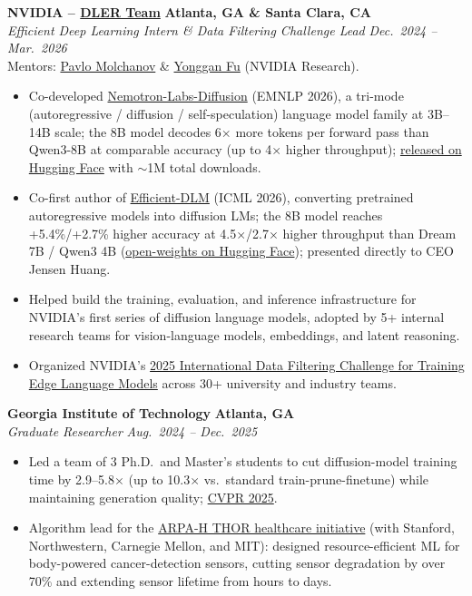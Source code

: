 \documentclass[10pt,a4paper]{article}
\newcommand{\cvlink}[2]{\href{#1}{#2}}
\newcommand{\entry}[4]{%
  \noindent\textbf{#1} \hfill \textbf{#2}\\
  \textit{#3} \hfill \textit{#4}%
}
\begin{document}
\smallskip
\entry{NVIDIA -- \cvlink{https://nv-dler.github.io/}{DLER Team}}{Atlanta, GA \& Santa Clara, CA}{Efficient Deep Learning Intern \& Data Filtering Challenge Lead}{Dec.\ 2024 -- Mar.\ 2026}\\
{\footnotesize Mentors: \cvlink{https://pmolchanov.com/}{Pavlo Molchanov} \& \cvlink{https://www.yongganfu.com/}{Yonggan Fu} (NVIDIA Research).}
\begin{itemize}[leftmargin=*, nosep, itemsep=2pt, topsep=2pt]
  \item Co-developed \cvlink{https://arxiv.org/pdf/2607.05722}{Nemotron-Labs-Diffusion} (EMNLP 2026), a tri-mode (autoregressive / diffusion / self-speculation) language model family at 3B--14B scale; the 8B model decodes 6$\times$ more tokens per forward pass than Qwen3-8B at comparable accuracy (up to 4$\times$ higher throughput); \cvlink{https://huggingface.co/collections/nvidia/nemotron-labs-diffusion}{released on Hugging Face} with $\sim$1M total downloads.
  \item Co-first author of \cvlink{https://arxiv.org/pdf/2512.14067}{Efficient-DLM} (ICML 2026), converting pretrained autoregressive models into diffusion LMs; the 8B model reaches +5.4\%/+2.7\% higher accuracy at 4.5$\times$/2.7$\times$ higher throughput than Dream 7B / Qwen3 4B (\cvlink{https://huggingface.co/collections/nvidia/efficient-dlm}{open-weights on Hugging Face}); presented directly to CEO Jensen Huang.
  \item Helped build the training, evaluation, and inference infrastructure for NVIDIA's first series of diffusion language models, adopted by 5+ internal research teams for vision-language models, embeddings, and latent reasoning.
  \item Organized NVIDIA's \href{https://sites.google.com/view/datafilteringchallenge/home}{2025 International Data Filtering Challenge for Training Edge Language Models} across 30+ university and industry teams.
\end{itemize}

\smallskip
\entry{Georgia Institute of Technology}{Atlanta, GA}{Graduate Researcher}{Aug.\ 2024 -- Dec.\ 2025}
\begin{itemize}[leftmargin=*, nosep, itemsep=2pt, topsep=2pt]
  \item Led a team of 3 Ph.D.\ and Master's students to cut diffusion-model training time by 2.9--5.8$\times$ (up to 10.3$\times$ vs.\ standard train-prune-finetune) while maintaining generation quality; \cvlink{https://openaccess.thecvf.com/content/CVPR2025/html/Whalen_Early-Bird_Diffusion_Investigating_and_Leveraging_Timestep-Aware_Early-Bird_Tickets_in_Diffusion_CVPR_2025_paper.html}{CVPR 2025}.
  \item Algorithm lead for the \cvlink{https://responsible.computing.gatech.edu/featured-project-thor/}{ARPA-H THOR healthcare initiative} (with Stanford, Northwestern, Carnegie Mellon, and MIT): designed resource-efficient ML for body-powered cancer-detection sensors, cutting sensor degradation by over 70\% and extending sensor lifetime from hours to days.
\end{itemize}
\end{document}
